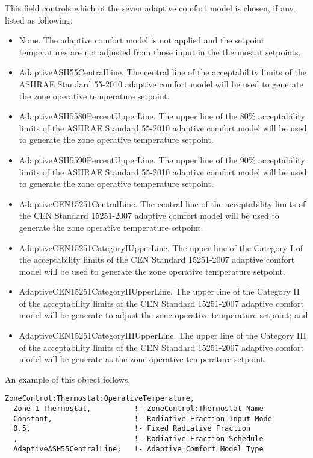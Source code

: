 This field controls which of the seven adaptive comfort model is chosen, if any, listed as following:
\begin{itemize}
\tightlist
\item None. The adaptive comfort model is not applied and the setpoint temperatures are not adjusted from those input in the thermostat setpoints.
\item AdaptiveASH55CentralLine. The central line of the acceptability limits of the ASHRAE Standard 55-2010 adaptive comfort model will be used to generate the zone operative temperature setpoint.
\item AdaptiveASH5580PercentUpperLine. The upper line of the 80\% acceptability limits of the ASHRAE Standard 55-2010 adaptive comfort model will be used to generate the zone operative temperature setpoint.
\item AdaptiveASH5590PercentUpperLine. The upper line of the 90\% acceptability limits of the ASHRAE Standard 55-2010 adaptive comfort model will be used to generate the zone operative temperature setpoint.
\item AdaptiveCEN15251CentralLine. The central line of the acceptability limits of the CEN Standard 15251-2007 adaptive comfort model will be used to generate the zone operative temperature setpoint.
\item AdaptiveCEN15251CategoryIUpperLine. The upper line of the Category I of the acceptability limits of the CEN Standard 15251-2007 adaptive comfort model will be used to generate the zone operative temperature setpoint.
\item AdaptiveCEN15251CategoryIIUpperLine. The upper line of the Category II of the acceptability limits of the CEN Standard 15251-2007 adaptive comfort model will be generate to adjust the zone operative temperature setpoint; and
\item AdaptiveCEN15251CategoryIIIUpperLine. The upper line of the Category III of the acceptability limits of the CEN Standard 15251-2007 adaptive comfort model will be generate as the zone operative temperature setpoint.
\end{itemize}

An example of this object follows.

\begin{lstlisting}
ZoneControl:Thermostat:OperativeTemperature,
  Zone 1 Thermostat,          !- ZoneControl:Thermostat Name
  Constant,                   !- Radiative Fraction Input Mode
  0.5,                        !- Fixed Radiative Fraction
  ,                           !- Radiative Fraction Schedule
  AdaptiveASH55CentralLine;   !- Adaptive Comfort Model Type
\end{lstlisting}

